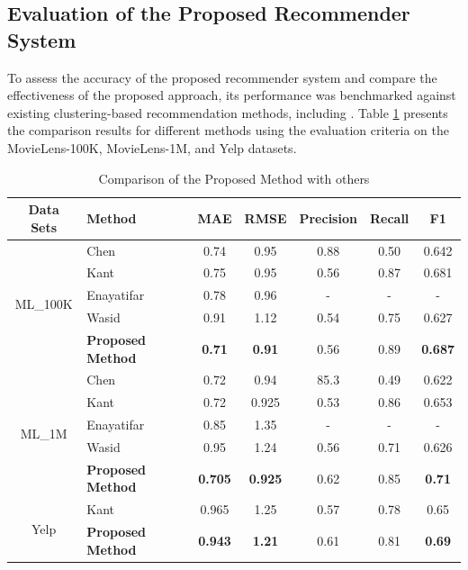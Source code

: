 \documentclass{article}
\begin{document}
\subsection{Evaluation of the Proposed Recommender System}
To assess the accuracy of the proposed recommender system and compare the effectiveness of the proposed approach, its performance was benchmarked against existing clustering-based recommendation methods, including \cite{liji2018improved, kant2017leaderrank, mohammadpour2019efficient, wasid2018clustering}. Table \ref{tab:comparison_results} presents the comparison results for different methods using the evaluation criteria on the MovieLens-100K, MovieLens-1M, and Yelp datasets.

\begin{table}[htbp]
\centering
\caption{Comparison of the Proposed Method with others}
\label{tab:comparison_results}
\renewcommand{\arraystretch}{1.3}
\setlength{\tabcolsep}{3pt}
\begin{tabular}{clccccc}
\hline
\textbf{Data Sets} & \textbf{Method} & \textbf{MAE} & \textbf{RMSE} & \textbf{Precision} & \textbf{Recall} & \textbf{F1} \\
\hline
\multirow{5}{*}{ML\_100K} & Chen\cite{liji2018improved} & 0.74 & 0.95 & 0.88 & 0.50 & 0.642 \\
& Kant\cite{kant2017leaderrank} & 0.75 & 0.95 & 0.56 & 0.87 & 0.681 \\
& Enayatifar \cite{mohammadpour2019efficient} & 0.78 & 0.96 & - & - & - \\
& Wasid \cite{wasid2018clustering} & 0.91 & 1.12 & 0.54 & 0.75 & 0.627 \\
& \textbf{Proposed Method} & \textbf{0.71} & \textbf{0.91} & 0.56 & 0.89 & \textbf{0.687} \\
\hline
\multirow{5}{*}{ML\_1M} & Chen & 0.72 & 0.94 & 85.3 & 0.49 & 0.622 \\
& Kant & 0.72 & 0.925 & 0.53 & 0.86 & 0.653 \\
& Enayatifar & 0.85 & 1.35 & - & - & - \\
& Wasid & 0.95 & 1.24 & 0.56 & 0.71 & 0.626 \\
& \textbf{Proposed Method} & \textbf{0.705} & \textbf{0.925} & 0.62 & 0.85 & \textbf{0.71} \\
\hline
\multirow{3}{*}{Yelp} & Kant & 0.965 & 1.25 & 0.57 & 0.78 & 0.65 \\
&  \textbf{Proposed Method} & \textbf{0.943} & \textbf{1.21} & 0.61 & 0.81 & \textbf{0.69} \\
\hline
\end{tabular}
\end{table}
\end{document}
